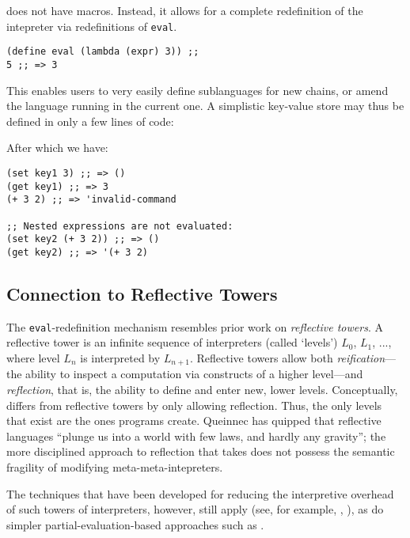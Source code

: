 
\rad does not have macros. Instead, it allows for a complete redefinition of
the intepreter via redefinitions of \texttt{eval}.

\begin{verbatim}
(define eval (lambda (expr) 3)) ;;
5 ;; => 3
\end{verbatim}

This enables users to very easily define sublanguages for new chains, or amend
the language running in the current one. A simplistic key-value store may thus
be defined in only a few lines of code:



After which we have:

\begin{verbatim}
(set key1 3) ;; => ()
(get key1) ;; => 3
(+ 3 2) ;; => 'invalid-command

;; Nested expressions are not evaluated:
(set key2 (+ 3 2)) ;; => ()
(get key2) ;; => '(+ 3 2)
\end{verbatim}

\subsection{Connection to Reflective Towers}
\label{s:reflective-towers}

The \texttt{eval}-redefinition
mechanism resembles prior work on \emph{reflective towers}. A reflective
tower is an infinite sequence of interpreters (called `levels') $L_0$, $L_1$, ..., where
level $L_n$ is interpreted by $L_{n+1}$. Reflective towers allow both
\emph{reification}---the ability to inspect a computation via constructs of a
higher level---and \emph{reflection}, that is, the ability to define and enter new,
lower levels. Conceptually, \rad differs from reflective towers by only
allowing reflection. Thus, the only levels that exist are the ones programs
create. Queinnec has quipped that reflective languages ``plunge us into a world
with few laws, and hardly any gravity''\cite{Queinnec1994}; the more disciplined approach to
reflection that \rad takes does not possess the semantic fragility of modifying
meta-meta-intepreters.

The techniques that have been developed for reducing the interpretive overhead
of such towers of interpreters, however, still
apply (see, for example, \cite{Amin2017}, \cite{Asai2014}), as do simpler
partial-evaluation-based approaches such as \cite{Brown2017}.



